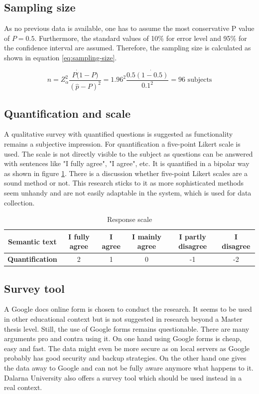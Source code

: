 \documentclass[12pt,a4paper,paper=a4,oneside,titlepage,pdftex]{scrartcl}
\begin{document}
\subsection{Sampling size}
As no previous data is available, one has to assume the most conservative P value of $ P = 0.5 $. Furthermore, the standard values of 10\% for error level and 95\% for the confidence interval are assumed. Therefore, the sampling size is calculated as shown in equation \ref{eq:sampling-size}.

\begin{equation}
n = Z^2_\alpha \frac{P\dot(1-P)}{(\hat{p}-P)^2} = 1.96^2\frac{0.5\dot{(1-0.5)}}{0.1^2}=96 \text{ subjects}
\label{eq:sampling-size}
\end{equation}

\subsection{Quantification and scale}

A qualitative survey \cite{sofaer1999qualitative} with quantified questions is suggested as functionality remains a subjective impression. For quantification a five-point Likert scale \cite{likert1932technique} is used. The scale is not directly visible to the subject as questions can be answered with sentences like "I fully agree", "I agree", etc. It is quantified in a bipolar way as shown in figure \ref{tab:response-scale}.  There is a discussion \cite{cummins2000we} whether five-point Likert scales are a sound method or not. This research sticks to it as more sophisticated methods \cite{chimi2009likert} seem unhandy and are not easily adaptable in the system, which is used for data collection.

\begin{table}[h!]
\begin{tabular}{|c|| c|c|c|c|c|}
\hline
\textbf{Semantic text} & I fully agree & I agree & I mainly agree & I partly disagree & I disagree \\ \hline
\textbf{Quantification} & 2 & 1 & 0 & -1 & -2 \\ \hline
\end{tabular}
	\caption{Response scale}
	\label{tab:response-scale}
\end{table}


\subsection{Survey tool}
A Google docs online form is chosen to conduct the research. It seems to be used in other educational context \cite{gehringer2010daily} but is not suggested in research beyond a Master thesis level. Still, the use of Google forms remains questionable. There are many arguments pro and contra using it. On one hand using Google forms is cheap, easy and fast. The data might even be more secure as on local servers as Google probably has good security and backup strategies. On the other hand one gives the data away to Google and can not be fully aware anymore what happens to it. Dalarna University also offers a survey tool which should be used instead in a real context.
\end{document}
